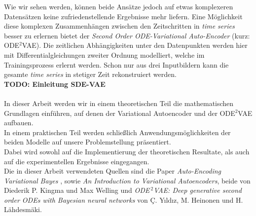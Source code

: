 \documentclass[12pt]{article}
\begin{document}
	Wie wir sehen werden, können beide Ansätze jedoch auf etwas komplexeren Datensätzen keine zufriedenstellende Ergebnisse mehr liefern.
	Eine Möglichkeit diese komplexen Zusammenhängen zwischen den Zeitschritten in \emph{time series} besser zu erlernen bietet der \emph{Second Order ODE-Variational Auto-Encoder} (kurz: ODE$^2$VAE). Die zeitlichen Abhängigkeiten unter den Datenpunkten werden hier mit Differentialgleichungen zweiter Ordnung modelliert, welche im Trainingsprozess erlernt werden. Schon nur aus drei Inputbildern kann die gesamte \emph{time series} in stetiger Zeit rekonstruiert werden.\\
	\textbf{TODO: Einleitung SDE-VAE}
	\\
	\\
	In dieser Arbeit werden wir in einem theoretischen Teil die mathematischen Grundlagen einführen, auf denen der Variational Autoencoder und der ODE$^2$VAE aufbauen.\\
	In einem praktischen Teil werden schließlich Anwendungsmöglichkeiten der beiden Modelle auf unsere Problemstellung präsentiert.\\
	Dabei wird sowohl auf die Implementierung der
	theoretischen Resultate, als auch auf die experimentellen Ergebnisse eingegangen.\\
	Die in dieser Arbeit verwendeten Quellen sind die Paper \emph{Auto-Encoding Variational Bayes} \cite{vae}, sowie \emph{An Introduction to Variational Autoencoders}, \cite{intvae} beide von Diederik P. Kingma und Max Welling und \emph{ODE$^{\ 2}$VAE: Deep generative second order ODEs with Bayesian neural networks} \cite{ode2vae} von Ç. Yıldız, M. Heinonen und H. Lähdesmäki.
	\newpage
\end{document}
